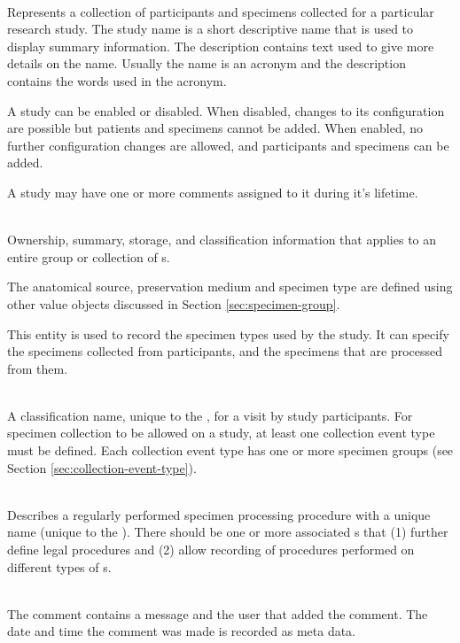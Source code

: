 \begin{description}[listparindent=\parindent]

  \item[\entitytarget{Study}] \hfill \\ Represents a collection of participants
    and specimens collected for a particular research study. The study name is
    a short descriptive name that is used to display summary information. The
    description contains text used to give more details on the name. Usually
    the name is an acronym and the description contains the words used in the
    acronym.

    A study can be enabled or disabled. When disabled, changes to its
    configuration are possible but patients and specimens cannot be added. When
    enabled, no further configuration changes are allowed, and participants and
    specimens can be added.

    A study may have one or more comments assigned to it during it's lifetime.

  \item[\entitytarget{SpecimenGroup}] \hfill \\ Ownership, summary, storage,
    and classification information that applies to an entire group or
    collection of s.

    The anatomical source, preservation medium and specimen type are defined
    using other value objects discussed in Section \ref{sec:specimen-group}.

    This entity is used to record the specimen types used by the study. It can
    specify the specimens collected from participants, and the specimens that
    are processed from them.

  \item[\entitytarget{CollectionEventType}] \hfill \\ A classification name,
    unique to the , for a visit by study participants. For
    specimen collection to be allowed on a study, at least one collection event
    type must be defined. Each collection event type has one or more specimen
    groups (see Section \ref{sec:collection-event-type}).

  \item[\entitytarget{ProcessingType}] \hfill \\ Describes a regularly
    performed specimen processing procedure with a unique name (unique to the
    ). There should be one or more associated
    s that (1) further define legal procedures and
    (2) allow recording of procedures performed on different types of
    s.

  \item[\valobjtarget{StudyComment}] \hfill \\ The comment contains a message
    and the user that added the comment. The date and time the comment was made
    is recorded as meta data.

\end{description}

